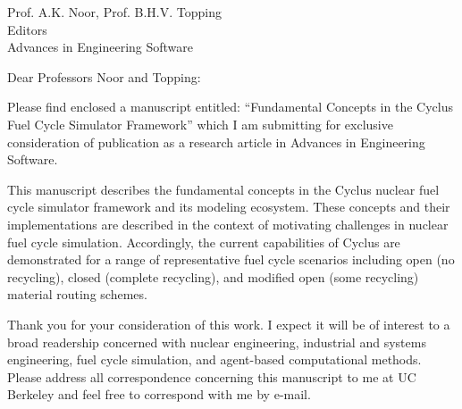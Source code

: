 \documentclass[11pt]{letter} %
\begin{document}


\begin{letter}{Prof. A.K. Noor, Prof. B.H.V. Topping\\
Editors\\
Advances in Engineering Software}

\address{Kathryn D. Huff\\
4155 Etcheverry Hall\\
MC 1730\\
Berkeley, CA 94720}



\opening{Dear Professors Noor and Topping:}

Please find enclosed a manuscript entitled: ``Fundamental Concepts in the 
Cyclus Fuel Cycle Simulator Framework'' which I am submitting for exclusive 
consideration of publication as a research article in Advances in Engineering 
Software.

This manuscript describes the fundamental concepts in the Cyclus nuclear fuel 
cycle simulator framework and its modeling ecosystem. These concepts and their 
implementations are described in the context of motivating challenges in 
nuclear fuel cycle simulation. Accordingly, the current capabilities of Cyclus 
are demonstrated for a range of representative fuel cycle scenarios including 
open (no recycling), closed (complete recycling), and modified open (some 
recycling) material routing schemes.


Thank you for your consideration of this work. I expect it will be of interest
to a broad readership concerned with nuclear engineering, industrial and 
systems engineering, fuel cycle simulation, and agent-based computational 
methods. Please address all correspondence concerning this manuscript to me at 
UC Berkeley and feel free to correspond with me by e-mail.  


\end{letter}
\end{document}
